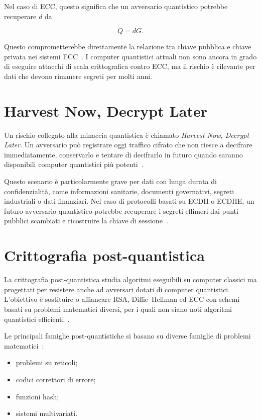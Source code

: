 \documentclass[12pt,a4paper,oneside]{report}
\begin{document}
Nel caso di ECC, questo significa che un avversario quantistico potrebbe recuperare \(d\) da

\[
Q=dG.
\]

Questo comprometterebbe direttamente la relazione tra chiave pubblica e chiave privata nei sistemi ECC~\cite{margara_pqc}. I computer quantistici attuali non sono ancora in grado di eseguire attacchi di scala crittografica contro ECC, ma il rischio è rilevante per dati che devono rimanere segreti per molti anni.

\section{Harvest Now, Decrypt Later}

Un rischio collegato alla minaccia quantistica è chiamato \textit{Harvest Now, Decrypt Later}. Un avversario può registrare oggi traffico cifrato che non riesce a decifrare immediatamente, conservarlo e tentare di decifrarlo in futuro quando saranno disponibili computer quantistici più potenti~\cite{margara_pqc}.

Questo scenario è particolarmente grave per dati con lunga durata di confidenzialità, come informazioni sanitarie, documenti governativi, segreti industriali o dati finanziari. Nel caso di protocolli basati su ECDH o ECDHE, un futuro avversario quantistico potrebbe recuperare i segreti effimeri dai punti pubblici scambiati e ricostruire la chiave di sessione~\cite{margara_pqc}.

\section{Crittografia post-quantistica}

La crittografia post-quantistica studia algoritmi eseguibili su computer classici ma progettati per resistere anche ad avversari dotati di computer quantistici. L'obiettivo è sostituire o affiancare RSA, Diffie--Hellman ed ECC con schemi basati su problemi matematici diversi, per i quali non siano noti algoritmi quantistici efficienti~\cite{margara_pqc}.

Le principali famiglie post-quantistiche si basano su diverse famiglie di problemi matematici~\cite{margara_pqc}:

\begin{itemize}
    \item problemi su reticoli;
    \item codici correttori di errore;
    \item funzioni hash;
    \item sistemi multivariati.
\end{itemize}
\end{document}
